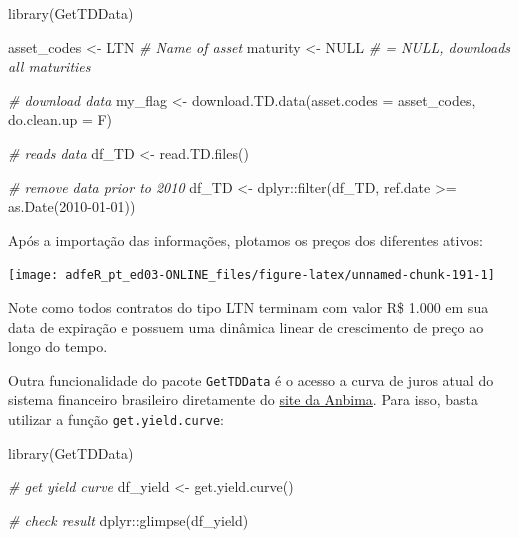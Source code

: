 \documentclass[
  11pt,
]{book}
\newenvironment{Shaded}{\begin{snugshade}}{\end{snugshade}}
\newcommand{\AttributeTok}[1]{\textcolor[rgb]{0.61,0.61,0.61}{#1}}
\newcommand{\CommentTok}[1]{\textcolor[rgb]{0.37,0.37,0.37}{\textit{#1}}}
\newcommand{\ConstantTok}[1]{\textcolor[rgb]{0,0,0}{#1}}
\newcommand{\FunctionTok}[1]{\textcolor[rgb]{0,0,0}{#1}}
\newcommand{\NormalTok}[1]{#1}
\newcommand{\OtherTok}[1]{\textcolor[rgb]{0.37,0.37,0.37}{#1}}
\newcommand{\SpecialCharTok}[1]{\textcolor[rgb]{0,0,0}{#1}}
\newcommand{\StringTok}[1]{\textcolor[rgb]{0.5,0.5,0.5}{#1}}
\begin{document}
\begin{Shaded}
\begin{Highlighting}[]
\FunctionTok{library}\NormalTok{(GetTDData)}

\NormalTok{asset\_codes }\OtherTok{\textless{}{-}} \StringTok{\textquotesingle{}LTN\textquotesingle{}}   \CommentTok{\# Name of asset}
\NormalTok{maturity }\OtherTok{\textless{}{-}} \ConstantTok{NULL}      \CommentTok{\# = NULL, downloads all maturities}

\CommentTok{\# download data}
\NormalTok{my\_flag }\OtherTok{\textless{}{-}} \FunctionTok{download.TD.data}\NormalTok{(}\AttributeTok{asset.codes =}\NormalTok{ asset\_codes,}
                            \AttributeTok{do.clean.up =}\NormalTok{ F)}

\CommentTok{\# reads data}
\NormalTok{df\_TD }\OtherTok{\textless{}{-}} \FunctionTok{read.TD.files}\NormalTok{()}

\CommentTok{\# remove data prior to 2010}
\NormalTok{df\_TD }\OtherTok{\textless{}{-}}\NormalTok{ dplyr}\SpecialCharTok{::}\FunctionTok{filter}\NormalTok{(df\_TD,}
\NormalTok{                       ref.date }\SpecialCharTok{\textgreater{}=} \FunctionTok{as.Date}\NormalTok{(}\StringTok{\textquotesingle{}2010{-}01{-}01\textquotesingle{}}\NormalTok{))}
\end{Highlighting}
\end{Shaded}

Após a importação das informações, plotamos os preços dos diferentes ativos:

\begin{center}\texttt{[image: adfeR\_pt\_ed03-ONLINE\_files/figure-latex/unnamed-chunk-191-1]} \end{center}

Note como todos contratos do tipo LTN terminam com valor R\$ 1.000 em sua data de expiração e possuem uma dinâmica linear de crescimento de preço ao longo do tempo.

Outra funcionalidade do pacote \texttt{GetTDData} é o acesso a curva de juros atual do sistema financeiro brasileiro diretamente do \href{https://www.anbima.com.br/pt_br/informar/curvas-de-juros-fechamento.htm}{site da Anbima}. Para isso, basta utilizar a função \texttt{get.yield.curve}:


\begin{Shaded}
\begin{Highlighting}[]
\FunctionTok{library}\NormalTok{(GetTDData)}

\CommentTok{\# get yield curve}
\NormalTok{df\_yield }\OtherTok{\textless{}{-}} \FunctionTok{get.yield.curve}\NormalTok{()}

\CommentTok{\# check result}
\NormalTok{dplyr}\SpecialCharTok{::}\FunctionTok{glimpse}\NormalTok{(df\_yield)}
\end{Highlighting}
\end{Shaded}
\end{document}
